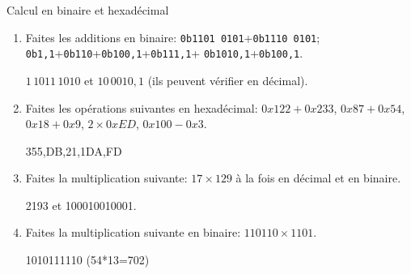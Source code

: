 \begin{exercice}
  \begin{exercicelet}{Calcul en binaire et hexadécimal}
    \begin{enumerate}
    \item Faites les additions en binaire:
      \texttt{0b1101\,0101}+\texttt{0b1110\,0101};
      \texttt{0b1,1}+\texttt{0b110}+\texttt{0b100,1}+\texttt{0b111,1}+%
      \texttt{0b1010,1}+\texttt{0b100,1}.
      \begin{xcorrection}$1\,1011\,1010$ et $10\,0010,1$ (ils peuvent
        vérifier en décimal).\end{xcorrection}
    \item Faites les opérations suivantes en hexadécimal: $0x122+0x233$,
      $0x87+0x54$, $0x18+0x9$, $2\times 0xED$, $0x100-0x3$.
      \begin{xcorrection}355,DB,21,1DA,FD\end{xcorrection}
    \item Faites la multiplication suivante: $17\times129$ à la fois en
      décimal et en binaire.
      \begin{xcorrection}2193 et 100010010001.\end{xcorrection}
    \item Faites la multiplication suivante en binaire: $110110\times 1101$.
      \begin{xcorrection}1010111110 (54*13=702)\end{xcorrection}
    \end{enumerate}
  \end{exercicelet}
\end{exercice}
